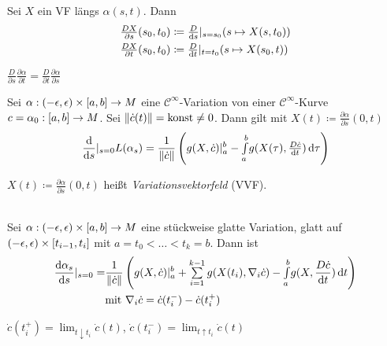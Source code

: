 \documentclass{cheat-sheet}
\newcommand{\vinterval}{\ointerval{-\epsilon}{\epsilon}} %
\newcommand{\abinterval}{\cinterval{a}{b}} %
\newcommand{\Cont}{\mathcal{C}} %
\begin{document}
\begin{nota}
  Sei $X$ ein VF längs $\alpha(s, t)$. Dann
  \begin{align*}
    \tfrac{D X}{\partial s} (s_0, t_0) & \coloneqq \tfrac{D}{\mathrm{d} s} |_{s=s_0} (s \mapsto X(s, t_0)) \\
    \tfrac{D X}{\partial t} (s_0, t_0) & \coloneqq \tfrac{D}{\mathrm{d} t} |_{t=t_0} (s \mapsto X(s_0, t))
  \end{align*}
\end{nota}

\begin{lem}
  $\frac{D}{\partial s} \frac{\partial \alpha}{\partial t} = \frac{D}{\partial t} \frac{\partial \alpha}{\partial s}$
\end{lem}

\begin{satz}
  Sei $\alpha : \vinterval \times \abinterval \to M$ eine $\Cont^\infty$-Variation von einer $\Cont^\infty$-Kurve $c = \alpha_0 : \abinterval \to M$. Sei $\lVert\dot{c}(t)\rVert = \text{konst} \not= 0$. Dann gilt mit $X(t) \coloneqq \tfrac{\partial \alpha}{\partial s} (0, t)$
  \[ \frac{\mathrm{d}}{\mathrm{d} s} |_{s=0} L(\alpha_s) = \frac{1}{\lVert\dot{c}\rVert} \left( g(X, \dot{c})|_a^b - {\textstyle \int\limits_{a}^{b}} g(X(\tau), \tfrac{D \dot{c}}{\mathrm{d} t}) \,\mathrm{d} \tau \right) \]
\end{satz}

\begin{sprech}
  $X(t) \!\coloneqq\! \tfrac{\partial \alpha}{\partial s} (0, t)$ heißt \emph{Variationsvektorfeld} (VVF).
\end{sprech}


\begin{satz}\mbox{}\\
  Sei $\alpha : \vinterval \times \abinterval \to M$ eine stückweise glatte Variation, glatt auf $\vinterval \times \cinterval{t_{i-1}}{t_i}$ mit $a = t_0 < \ldots < t_k = b$. Dann ist
  \begin{align*}
    \frac{\d \alpha_s}{\d s} |_{s=0} = & \frac{1}{\norm{\dot{c}}} \left( g(X, \dot{c})|_a^b + \sum_{i=1}^{k-1} g(X(t_i), \nabla_i \dot{c}) - \Int{a}{b}{g(X, \frac{D \dot{c}}{\d t})}{t} \right) \\
    & \text{mit } \nabla_i \dot{c} = \dot{c}(t_i^-) - \dot{c}(t_i^+)
  \end{align*}
\end{satz}

\begin{nota}
  $\dot{c}(t_i^+) = \lim_{t \downarrow t_i} \dot{c}(t)$, \enspace
  $\dot{c}(t_i^-) = \lim_{t \uparrow t_i} \dot{c}(t)$
\end{nota}
\end{document}
